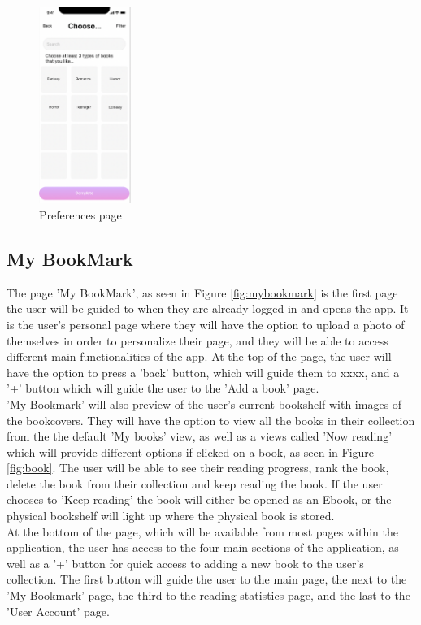 \documentclass[conference]{IEEEtran}
\begin{document}
\begin{figure}[h]
    \centering
    \includegraphics[width=3cm]{Resources/Specifications/categories.png}
    \caption{Preferences page}
    \label{fig:categories}
\end{figure}



\subsection{My BookMark}
The page 'My BookMark', as seen in Figure \ref{fig:mybookmark} is the first page the user will be guided to when they are already logged in and opens the app. It is the user's personal page where they will have the option to upload a photo of themselves in order to personalize their page, and they will be able to access different main functionalities of the app. At the top of the page, the user will have the option to press a 'back' button, which will guide them to xxxx, and a '+' button which will guide the user to the 'Add a book' page. \\

'My Bookmark' will also preview of the user's current bookshelf with images of the bookcovers. They will have the option to view all the books in their collection from the the default 'My books' view, as well as a views called 'Now reading' which will provide different options if clicked on a book, as seen in Figure \ref{fig:book}. The user will be able to see their reading progress, rank the book, delete the book from their collection and keep reading the book. If the user chooses to 'Keep reading' the book will either be opened as an Ebook, or the physical bookshelf will light up where the physical book is stored.  \\

At the bottom of the page, which will be available from most pages within the application, the user has access to the four main sections of the application, as well as a '+' button for quick access to adding a new book to the user's collection. The first button will guide the user to the main page, the next to the 'My Bookmark' page, the third to the reading statistics page, and the last to the 'User Account' page.
\end{document}

